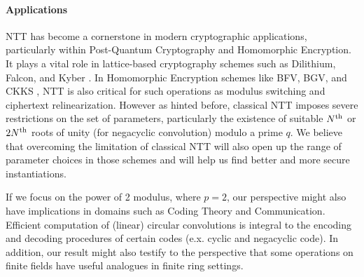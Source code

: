 \paragraph{Applications}
NTT has become a cornerstone in modern cryptographic applications, particularly within Post-Quantum Cryptography and Homomorphic Encryption. It plays a vital role in lattice-based cryptography schemes such as Dilithium, Falcon, and Kyber .  In Homomorphic Encryption schemes like BFV, BGV, and CKKS , NTT is also critical for such operations as modulus switching and ciphertext relinearization. However as hinted before, classical NTT imposes severe restrictions on the set of parameters, particularly the existence of suitable \(N\textsuperscript{th}\) or \(2N\textsuperscript{th}\) roots of unity (for negacyclic convolution) modulo a prime \(q\). We believe that overcoming the limitation of classical NTT will also open up the range of parameter choices in those schemes and will help us find better and more secure instantiations.

If we focus on the power of 2 modulus, where \(p = 2\), our perspective might also have implications in domains such as Coding Theory and Communication. Efficient computation of (linear) circular convolutions is integral to the encoding and decoding procedures of certain codes (e.x. cyclic and negacyclic code). In addition, our result might also testify to the perspective that some operations on finite fields have useful analogues in finite ring settings.